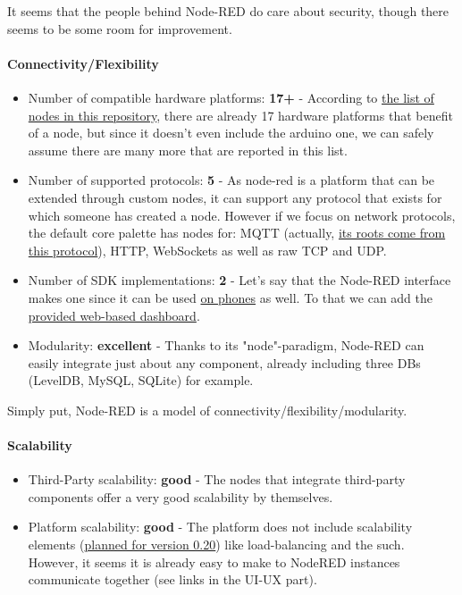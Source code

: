 \documentclass{article}
\begin{document}
It seems that the people behind Node-RED do care about security, though there seems to be some room for improvement.

\paragraph{Connectivity/Flexibility}

\begin{itemize}
\item Number of compatible hardware platforms: \textbf{17+} - According to \href{https://github.com/node-red/node-red-nodes}{the list of nodes in this repository}, there are already 17 hardware platforms that benefit of a node, but since it doesn't even include the arduino one, we can safely assume there are many more that are reported in this list.
\item Number of supported protocols: \textbf{5} - As node-red is a platform that can be extended through custom nodes, it can support any protocol that exists for which someone has created a node. However if we focus on network protocols, the default core palette has nodes for: MQTT (actually, \href{https://nodered.org/about/}{its roots come from this protocol}), HTTP, WebSockets as well as raw TCP and UDP.
\item Number of SDK implementations: \textbf{2} - Let's say that the Node-RED interface makes one since it can be used \href{https://nodered.org/docs/platforms/android}{on phones} as well. To that we can add the \href{https://github.com/node-red/node-red-dashboard}{provided web-based dashboard}.
\item Modularity: \textbf{excellent} - Thanks to its "node"-paradigm, Node-RED can easily integrate just about any component, already including three DBs (LevelDB, MySQL, SQLite) for example.
\end{itemize}

Simply put, Node-RED is a model of connectivity/flexibility/modularity.

\paragraph{Scalability}

\begin{itemize}
\item Third-Party scalability: \textbf{good} - The nodes that integrate third-party components offer a very good scalability by themselves.
\item Platform scalability: \textbf{good} - The platform does not include scalability elements (\href{https://nodered.org/blog/2017/07/17/roadmap-to-1-dot-0}{planned for version 0.20}) like load-balancing and the such. However, it seems it is already easy to make to NodeRED instances communicate together (see links in the UI-UX part).
\end{itemize}
\end{document}
